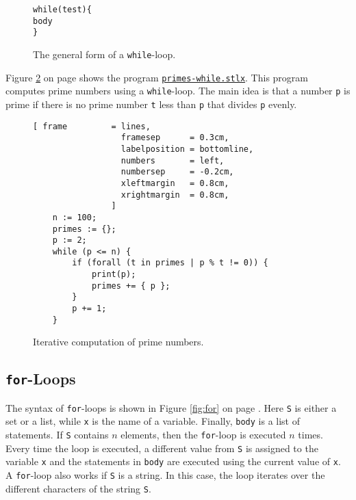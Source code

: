 \begin{figure}[!ht]
  \centering
\begin{alltt}
      while (test) \{
          body
      \}
\end{alltt}
\vspace*{-0.3cm}
\caption{The general form of a \texttt{while}-loop.  \label{fig:while}}
\end{figure} 

Figure \ref{fig:primes-while.stlx} on page \pageref{fig:primes-while.stlx} shows the program
\href{https://github.com/karlstroetmann/Logik/blob/master/SetlX/primes-while.stlx}{\texttt{primes-while.stlx}}.
This program computes prime numbers using a  \texttt{while}-loop.  The main idea is that a number \texttt{p} is
prime if there is no prime number \texttt{t} less than \texttt{p} that divides \texttt{p} evenly.


\begin{figure}[!ht]
  \centering
\begin{Verbatim}[ frame         = lines, 
                  framesep      = 0.3cm, 
                  labelposition = bottomline,
                  numbers       = left,
                  numbersep     = -0.2cm,
                  xleftmargin   = 0.8cm,
                  xrightmargin  = 0.8cm,
                ]
    n := 100;
    primes := {};
    p := 2;
    while (p <= n) {
        if (forall (t in primes | p % t != 0)) {
            print(p);
            primes += { p };
        }
        p += 1;
    }
\end{Verbatim} 
\vspace*{-0.3cm}
\caption{Iterative computation of prime numbers.}  \label{fig:primes-while.stlx}
\end{figure} %

\pagebreak

\subsection{\texttt{for}-Loops}
The syntax of  \texttt{for}-loops is shown in Figure \ref{fig:for} on page \pageref{fig:for}.  
Here \texttt{S} is either a set or a list, while \texttt{x} is the name of a variable.  Finally, \texttt{body}
is a list of statements.
If \texttt{S} contains $n$ elements, then the \texttt{for}-loop is executed $n$ times.  Every time the loop is
executed, a different value from \texttt{S} is assigned to the variable \texttt{x} and the statements in
\texttt{body} are executed using the current value of \texttt{x}.  A \texttt{for}-loop also works if \texttt{S}
is a string.  In this case, the loop iterates over the different characters of the string \texttt{S}.

